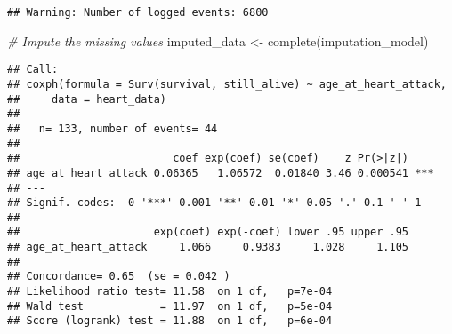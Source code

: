 \documentclass[
]{article}
\newenvironment{Shaded}{\begin{snugshade}}{\end{snugshade}}
\newcommand{\AttributeTok}[1]{\textcolor[rgb]{0.77,0.63,0.00}{#1}}
\newcommand{\CommentTok}[1]{\textcolor[rgb]{0.56,0.35,0.01}{\textit{#1}}}
\newcommand{\FunctionTok}[1]{\textcolor[rgb]{0.00,0.00,0.00}{#1}}
\newcommand{\NormalTok}[1]{#1}
\newcommand{\OtherTok}[1]{\textcolor[rgb]{0.56,0.35,0.01}{#1}}
\newcommand{\SpecialCharTok}[1]{\textcolor[rgb]{0.00,0.00,0.00}{#1}}
\begin{document}
\begin{verbatim}
## Warning: Number of logged events: 6800
\end{verbatim}

\begin{Shaded}
\begin{Highlighting}[]
\CommentTok{\# Impute the missing values}
\NormalTok{imputed\_data }\OtherTok{\textless{}{-}} \FunctionTok{complete}\NormalTok{(imputation\_model)}
\end{Highlighting}
\end{Shaded}

\begin{Shaded}
\end{Shaded}

\begin{verbatim}
## Call:
## coxph(formula = Surv(survival, still_alive) ~ age_at_heart_attack, 
##     data = heart_data)
## 
##   n= 133, number of events= 44 
## 
##                        coef exp(coef) se(coef)    z Pr(>|z|)    
## age_at_heart_attack 0.06365   1.06572  0.01840 3.46 0.000541 ***
## ---
## Signif. codes:  0 '***' 0.001 '**' 0.01 '*' 0.05 '.' 0.1 ' ' 1
## 
##                     exp(coef) exp(-coef) lower .95 upper .95
## age_at_heart_attack     1.066     0.9383     1.028     1.105
## 
## Concordance= 0.65  (se = 0.042 )
## Likelihood ratio test= 11.58  on 1 df,   p=7e-04
## Wald test            = 11.97  on 1 df,   p=5e-04
## Score (logrank) test = 11.88  on 1 df,   p=6e-04
\end{verbatim}
\end{document}
